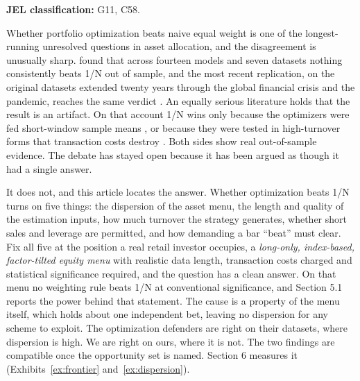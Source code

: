 \documentclass[12pt,letterpaper]{article}
\begin{document}
\noindent\textbf{JEL classification:} G11, C58.

\clearpage


Whether portfolio optimization beats naive equal weight is one of the
longest-running unresolved questions in asset allocation, and the disagreement
is unusually sharp. \citet{demiguel2009} found that across fourteen models and
seven datasets nothing consistently beats 1/N out of sample, and the most recent
replication, on the original datasets extended twenty years through the global
financial crisis and the pandemic, reaches the same verdict
\citep{gelmini2024}. An equally serious literature holds that the result is an
artifact. On that account 1/N wins only because the optimizers were fed
short-window sample means \citep{kritzman2010}, or because they were tested in
high-turnover forms that transaction costs destroy \citep{kirby2012}. Both sides
show real out-of-sample evidence. The debate has stayed open because it has been
argued as though it had a single answer.

It does not, and this article locates the answer. Whether optimization beats 1/N
turns on five things: the dispersion of the asset menu, the length and quality of
the estimation inputs, how much turnover the strategy generates, whether short
sales and leverage are permitted, and how demanding a bar ``beat'' must clear.
Fix all five at the position a real retail investor occupies, a \emph{long-only, index-based, factor-tilted equity menu} with realistic data length, transaction
costs charged and statistical significance required, and the question has a clean answer. On that menu no weighting rule beats 1/N at
conventional significance, and Section 5.1 reports the power behind that statement. The cause is a property of the menu
itself, which holds about one independent bet, leaving no dispersion for any
scheme to exploit. The optimization defenders are right on their datasets, where
dispersion is high. We are right on ours, where it is not. The two findings are
compatible once the opportunity set is named. Section 6 measures it
(Exhibits~\ref{ex:frontier} and~\ref{ex:dispersion}).
\end{document}
